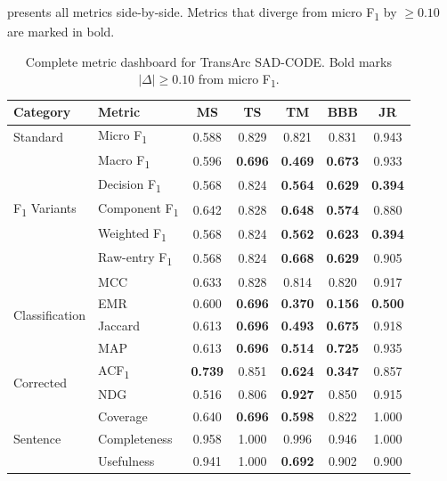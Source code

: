 \documentclass[11pt,a4paper]{report}
\newcommand{\sadcode}{SAD-CODE\xspace}
\newcommand{\transarc}{TransArc\xspace}
\newcommand{\fone}{F\textsubscript{1}\xspace}
\newcommand{\acfone}{ACF\textsubscript{1}\xspace}
\begin{document}
 presents all metrics side-by-side. Metrics that diverge
from micro \fone by ${\geq}0.10$ are marked in bold.

\begin{table}[h]
\caption{Complete metric dashboard for \transarc \sadcode. Bold marks
$|\Delta|{\geq}0.10$ from micro \fone.}
\label{tab:dashboard}
\centering\scriptsize
\begin{tabular}{llccccc}
\toprule
\textbf{Category} & \textbf{Metric} & \textbf{MS} & \textbf{TS} & \textbf{TM} & \textbf{BBB} & \textbf{JR} \\
\midrule
Standard & Micro \fone & 0.588 & 0.829 & 0.821 & 0.831 & 0.943 \\
\midrule
\multirow{5}{*}{\fone Variants}
 & Macro \fone         & 0.596 & \textbf{0.696} & \textbf{0.469} & \textbf{0.673} & 0.933 \\
 & Decision \fone      & 0.568 & 0.824 & \textbf{0.564} & \textbf{0.629} & \textbf{0.394} \\
 & Component \fone     & 0.642 & 0.828 & \textbf{0.648} & \textbf{0.574} & 0.880 \\
 & Weighted \fone      & 0.568 & 0.824 & \textbf{0.562} & \textbf{0.623} & \textbf{0.394} \\
 & Raw-entry \fone     & 0.568 & 0.824 & \textbf{0.668} & \textbf{0.629} & 0.905 \\
\midrule
\multirow{4}{*}{Classification}
 & MCC                 & 0.633 & 0.828 & 0.814 & 0.820 & 0.917 \\
 & EMR                 & 0.600 & \textbf{0.696} & \textbf{0.370} & \textbf{0.156} & \textbf{0.500} \\
 & Jaccard             & 0.613 & \textbf{0.696} & \textbf{0.493} & \textbf{0.675} & 0.918 \\
 & MAP                 & 0.613 & \textbf{0.696} & \textbf{0.514} & \textbf{0.725} & 0.935 \\
\midrule
\multirow{2}{*}{Corrected}
 & \acfone             & \textbf{0.739} & 0.851 & \textbf{0.624} & \textbf{0.347} & 0.857 \\
 & NDG                 & 0.516 & 0.806 & \textbf{0.927} & 0.850 & 0.915 \\
\midrule
\multirow{8}{*}{Sentence}
 & Coverage            & 0.640 & \textbf{0.696} & \textbf{0.598} & 0.822 & 1.000 \\
 & Completeness        & 0.958 & 1.000 & 0.996 & 0.946 & 1.000 \\
 & Usefulness          & 0.941 & 1.000 & \textbf{0.692} & 0.902 & 0.900 \\

\end{tabular}
\end{table}
\end{document}
